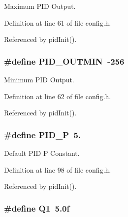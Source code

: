 Maximum P\-I\-D Output. 



Definition at line 61 of file config.\-h.



Referenced by pid\-Init().

\hypertarget{group__config_ga684067981e82e4827607d0b0558812cb}{
\subsubsection[{P\-I\-D\-\_\-\-O\-U\-T\-M\-I\-N}]{\setlength{\rightskip}{0pt plus 5cm}\#define P\-I\-D\-\_\-\-O\-U\-T\-M\-I\-N~-\/256}}\label{group__config_ga684067981e82e4827607d0b0558812cb}


Minimum P\-I\-D Output. 



Definition at line 62 of file config.\-h.



Referenced by pid\-Init().

\hypertarget{group__config_gab3ea7c9a4399d8844727806c960880ad}{
\subsubsection[{P\-I\-D\-\_\-\-P}]{\setlength{\rightskip}{0pt plus 5cm}\#define P\-I\-D\-\_\-\-P~5.}}\label{group__config_gab3ea7c9a4399d8844727806c960880ad}


Default P\-I\-D P Constant. 



Definition at line 98 of file config.\-h.



Referenced by pid\-Init().

\hypertarget{group__config_ga0f32727853a3ac3d848701803c3b8688}{
\subsubsection[{Q1}]{\setlength{\rightskip}{0pt plus 5cm}\#define Q1~5.\-0f}}\label{group__config_ga0f32727853a3ac3d848701803c3b8688}


